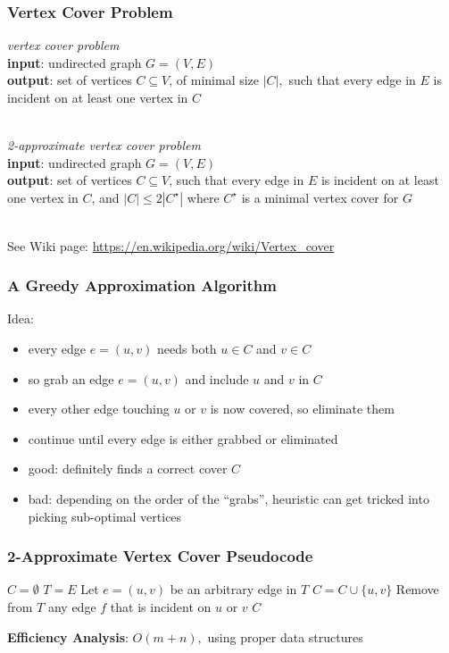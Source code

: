 \documentclass{beamer}
\newcommand{\stanza}{ \\~\ }
\begin{document}
\begin{frame} \frametitle{Vertex Cover Problem}
\emph{vertex cover problem} \\
\textbf{input}: undirected graph $G=(V,E)$ \\
\textbf{output}: set of vertices $C \subseteq V$, of minimal size $|C|,$ such
  that every edge in $E$ is incident on at least one vertex in $C$
 \stanza

 \emph{2-approximate vertex cover problem} \\
 \textbf{input}: undirected graph $G=(V,E)$ \\
 \textbf{output}: set of vertices $C \subseteq V$, such
   that every edge in $E$ is incident on at least one vertex in $C$, and
   $|C| \leq 2 |C^\star|$ where $C^\star$ is a minimal vertex cover for $G$
  \stanza

See Wiki page: \url{https://en.wikipedia.org/wiki/Vertex_cover}
\end{frame}

\begin{frame} \frametitle{A Greedy Approximation Algorithm}
Idea:
\begin{itemize}
  \item every edge $e=(u,v)$ needs both $u \in C$ and $v \in C$
  \item so grab an edge $e=(u,v)$ and include $u$ and $v$ in $C$
  \item every other edge touching $u$ or $v$ is now covered, so eliminate them
  \item continue until every edge is either grabbed or eliminated
  \item good: definitely finds a correct cover $C$
  \item bad: depending on the order of the ``grabs'', heuristic can get tricked
    into picking sub-optimal vertices
\end{itemize}
\end{frame}

\begin{frame} \frametitle{2-Approximate Vertex Cover Pseudocode}
  \begin{algorithmic}[1]
      \State $C=\emptyset$
      \State $T=E$
        \State Let $e=(u, v)$ be an arbitrary edge in $T$
        \State $C = C \cup \{u, v \}$
        \State Remove from $T$ any edge $f$ that is incident on $u$ or $v$
      \EndWhile
      \State \Return $C$
    \EndFunction
  \end{algorithmic}

\textbf{Efficiency Analysis}: $O(m+n),$ using proper data structures
\end{frame}
\end{document}
